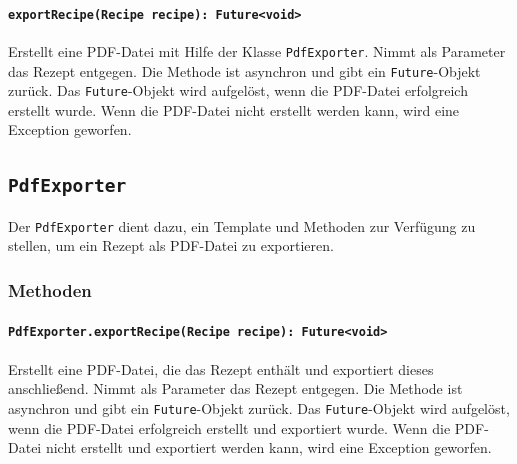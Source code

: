 \documentclass{entwurfsheft}
\begin{document}
\paragraph{\texttt{exportRecipe(Recipe recipe): Future<void>}}
Erstellt eine PDF-Datei mit Hilfe der Klasse \texttt{PdfExporter}. Nimmt als Parameter das Rezept entgegen. Die Methode ist asynchron und gibt ein \texttt{Future}-Objekt zurück. Das \texttt{Future}-Objekt wird aufgelöst, wenn die PDF-Datei erfolgreich erstellt wurde. Wenn die PDF-Datei nicht erstellt werden kann, wird eine Exception geworfen.

\newpage
\subsection{\texttt{PdfExporter}}\label{sec:PdfExporter}
Der \texttt{PdfExporter} dient dazu, ein Template und Methoden zur Verfügung zu stellen, um ein Rezept als PDF-Datei zu exportieren.
\subsubsection*{Methoden}
\paragraph{\texttt{PdfExporter.exportRecipe(Recipe recipe): Future<void>}}
Erstellt eine PDF-Datei, die das Rezept enthält und exportiert dieses anschließend. Nimmt als Parameter das Rezept entgegen. Die Methode ist asynchron und gibt ein \texttt{Future}-Objekt zurück. Das \texttt{Future}-Objekt wird aufgelöst, wenn die PDF-Datei erfolgreich erstellt und exportiert wurde. Wenn die PDF-Datei nicht erstellt und exportiert werden kann, wird eine Exception geworfen.
\newpage
\end{document}
